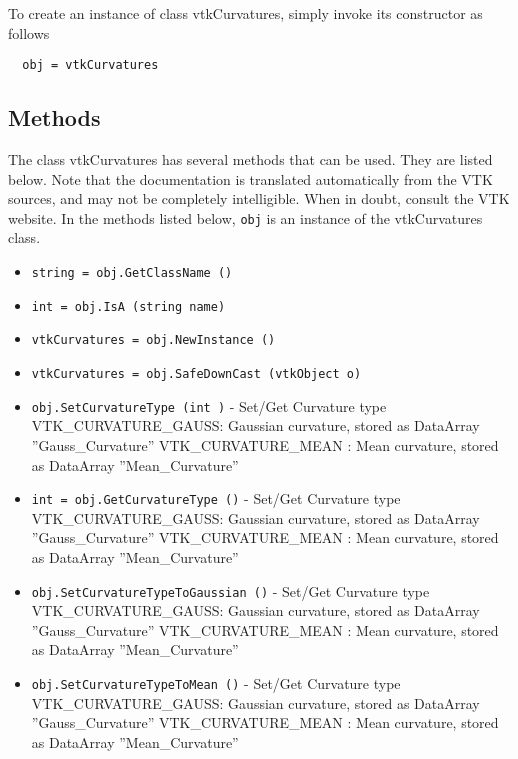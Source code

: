 To create an instance of class vtkCurvatures, simply
invoke its constructor as follows
\begin{verbatim}
  obj = vtkCurvatures
\end{verbatim}
\subsection{Methods}

The class vtkCurvatures has several methods that can be used.
  They are listed below.
Note that the documentation is translated automatically from the VTK sources,
and may not be completely intelligible.  When in doubt, consult the VTK website.
In the methods listed below, \verb|obj| is an instance of the vtkCurvatures class.
\begin{itemize}
\item  \verb|string = obj.GetClassName ()|

\item  \verb|int = obj.IsA (string name)|

\item  \verb|vtkCurvatures = obj.NewInstance ()|

\item  \verb|vtkCurvatures = obj.SafeDownCast (vtkObject o)|

\item  \verb|obj.SetCurvatureType (int )| -  Set/Get Curvature type
 VTK\_CURVATURE\_GAUSS: Gaussian curvature, stored as
 DataArray ''Gauss\_Curvature''
 VTK\_CURVATURE\_MEAN : Mean curvature, stored as
 DataArray ''Mean\_Curvature''

\item  \verb|int = obj.GetCurvatureType ()| -  Set/Get Curvature type
 VTK\_CURVATURE\_GAUSS: Gaussian curvature, stored as
 DataArray ''Gauss\_Curvature''
 VTK\_CURVATURE\_MEAN : Mean curvature, stored as
 DataArray ''Mean\_Curvature''

\item  \verb|obj.SetCurvatureTypeToGaussian ()| -  Set/Get Curvature type
 VTK\_CURVATURE\_GAUSS: Gaussian curvature, stored as
 DataArray ''Gauss\_Curvature''
 VTK\_CURVATURE\_MEAN : Mean curvature, stored as
 DataArray ''Mean\_Curvature''

\item  \verb|obj.SetCurvatureTypeToMean ()| -  Set/Get Curvature type
 VTK\_CURVATURE\_GAUSS: Gaussian curvature, stored as
 DataArray ''Gauss\_Curvature''
 VTK\_CURVATURE\_MEAN : Mean curvature, stored as
 DataArray ''Mean\_Curvature''


\end{itemize}
